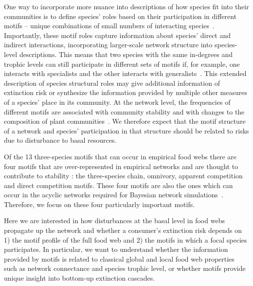 \documentclass[12pt]{article}
\begin{document}
\begin{spacing}{2.0}
    
    One way to incorporate more nuance into descriptions of how species fit into their communities is to define species' roles based on their participation in different motifs -- unique combinations of small numbers of interacting species~\citep{Stouffer2007,Stouffer2012}. Importantly, these motif roles capture information about species' direct and indirect interactions, incorporating larger-scale network structure into species-level descriptions. 
    This means that two species with the same in-degrees and trophic levels can still participate in different sets of motifs if, for example, one interacts with specialists and the other interacts with generalists~\citep{Cirtwill2018FoodWebs}. 
    This extended description of species structural roles may give additional information of extinction risk or synthesize the information provided by multiple other measures of a species' place in its community.
    At the network level, the frequencies of different motifs are associated with community stability \citep{prill2005dynamic, bascompte2005simple} and with changes to the composition of plant communities~\cite{giling2019plant}. 
    We therefore expect that the motif structure of a network and species' participation in that structure should be related to risks due to disturbance to basal resources. 
    
    
    Of the 13 three-species motifs that can occur in empirical food webs there are four motifs that are over-represented in empirical networks and are thought to contribute to stability \citep{Stouffer2007, Borrelli2015a, giling2019plant}: the three-species chain, omnivory, apparent competition and direct competition motifs.
    These four motifs are also the ones which can occur in the acyclic networks required for Bayesian network simulations~\citep{Eklof2013}. Therefore, we focus on these four particularly important motifs.  
    

    Here we are interested in how disturbances at the basal level in food webs propagate up the network and whether a consumer's extinction risk depends on 1) the motif profile of the full food web and 2) the motifs in which a focal species participates. In particular, we want to understand whether the information provided by motifs is related to classical global and local food web properties such as network connectance and species trophic level, or whether motifs provide unique insight into bottom-up extinction cascades.
  

\end{spacing}
\end{document}
